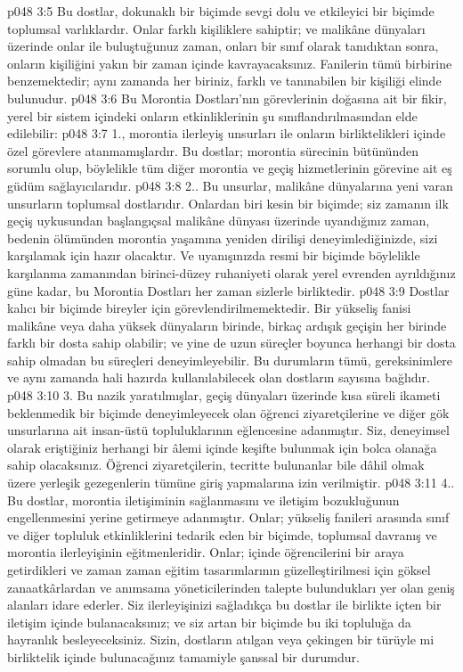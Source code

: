 \vs p048 3:5 Bu dostlar, dokunaklı bir biçimde sevgi dolu ve etkileyici bir biçimde toplumsal varlıklardır. Onlar farklı kişiliklere sahiptir; ve malikâne dünyaları üzerinde onlar ile buluştuğunuz zaman, onları bir sınıf olarak tanıdıktan sonra, onların kişiliğini yakın bir zaman içinde kavrayacaksınız. Fanilerin tümü birbirine benzemektedir; aynı zamanda her biriniz, farklı ve tanınabilen bir kişiliği elinde bulunudur.
\vs p048 3:6 Bu Morontia Dostları’nın görevlerinin doğasına ait bir fikir, yerel bir sistem içindeki onların etkinliklerinin şu sınıflandırılmasından elde edilebilir:
\vs p048 3:7 1.\bibnobreakspace {}, morontia ilerleyiş unsurları ile onların birliktelikleri içinde özel görevlere atanmamışlardır. Bu dostlar; morontia sürecinin bütününden sorumlu olup, böylelikle tüm diğer morontia ve geçiş hizmetlerinin görevine ait eş güdüm sağlayıcılarıdır.
\vs p048 3:8 2.\bibnobreakspace {}. Bu unsurlar, malikâne dünyalarına yeni varan unsurların toplumsal dostlarıdır. Onlardan biri kesin bir biçimde; siz zamanın ilk geçiş uykusundan başlangıçsal malikâne dünyası üzerinde uyandığınız zaman, bedenin ölümünden morontia yaşamına yeniden dirilişi deneyimlediğinizde, sizi karşılamak için hazır olacaktır. Ve uyanışınızda resmi bir biçimde böylelikle karşılanma zamanından birinci\hyp{}düzey ruhaniyeti olarak yerel evrenden ayrıldığınız güne kadar, bu Morontia Dostları her zaman sizlerle birliktedir.
\vs p048 3:9 Dostlar kalıcı bir biçimde bireyler için görevlendirilmemektedir. Bir yükseliş fanisi malikâne veya daha yüksek dünyaların birinde, birkaç ardışık geçişin her birinde farklı bir dosta sahip olabilir; ve yine de uzun süreçler boyunca herhangi bir dosta sahip olmadan bu süreçleri deneyimleyebilir. Bu durumların tümü, gereksinimlere ve aynı zamanda hali hazırda kullanılabilecek olan dostların sayısına bağlıdır.
\vs p048 3:10 3. Bu nazik yaratılmışlar, geçiş dünyaları üzerinde kısa süreli ikameti beklenmedik bir biçimde deneyimleyecek olan öğrenci ziyaretçilerine ve diğer gök unsurlarına ait insan\hyp{}üstü topluluklarının eğlencesine adanmıştır. Siz, deneyimsel olarak eriştiğiniz herhangi bir âlemi içinde keşifte bulunmak için bolca olanağa sahip olacaksınız. Öğrenci ziyaretçilerin, tecritte bulunanlar bile dâhil olmak üzere yerleşik gezegenlerin tümüne giriş yapmalarına izin verilmiştir.
\vs p048 3:11 4.\bibnobreakspace {}. Bu dostlar, morontia iletişiminin sağlanmasını ve iletişim bozukluğunun engellenmesini yerine getirmeye adanmıştır. Onlar; yükseliş fanileri arasında sınıf ve diğer topluluk etkinliklerini tedarik eden bir biçimde, toplumsal davranış ve morontia ilerleyişinin eğitmenleridir. Onlar; içinde öğrencilerini bir araya getirdikleri ve zaman zaman eğitim tasarımlarının güzelleştirilmesi için göksel zanaatkârlardan ve anımsama yöneticilerinden talepte bulundukları yer olan geniş alanları idare ederler. Siz ilerleyişinizi sağladıkça bu dostlar ile birlikte içten bir iletişim içinde bulanacaksınız; ve siz artan bir biçimde bu iki topluluğa da hayranlık besleyeceksiniz. Sizin, dostların atılgan veya çekingen bir türüyle mi birliktelik içinde bulunacağınız tamamiyle şanssal bir durumdur.
